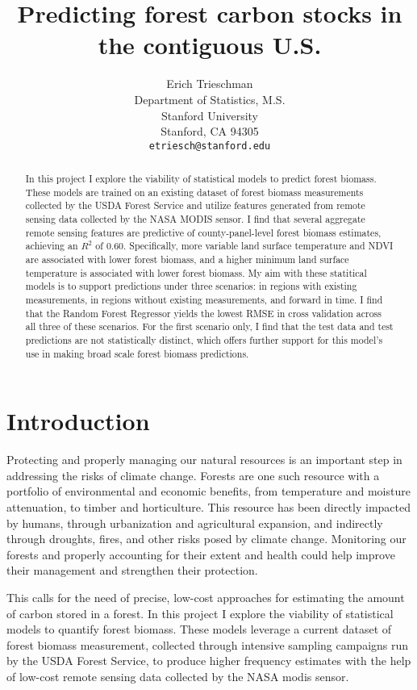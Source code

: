 \documentclass{article}
\title{Predicting forest carbon stocks in the contiguous U.S.}
\author{%
  Erich Trieschman\\
  Department of Statistics, M.S.\\
  Stanford University\\
  Stanford, CA 94305\\
  \texttt{etriesch@stanford.edu} \\
}
\begin{document}
\maketitle

\begin{abstract}
In this project I explore the viability of statistical models to predict forest biomass. These models are trained on an existing dataset of forest biomass measurements collected by the USDA Forest Service and utilize features generated from remote sensing data collected by the NASA MODIS sensor. I find that several aggregate remote sensing features are predictive of county-panel-level forest biomass estimates, achieving an $R^2$ of 0.60. Specifically, more variable land surface temperature and NDVI are associated with lower forest biomass, and a higher minimum land surface temperature is associated with lower forest biomass. My aim with these statitical models is to support predictions under three scenarios: in regions with existing measurements, in regions without existing measurements, and forward in time. I find that the Random Forest Regressor yields the lowest RMSE in cross validation across all three of these scenarios. For the first scenario only, I find that the test data and test predictions are not statistically distinct, which offers further support for this model's use in making broad scale forest biomass predictions.
\end{abstract}

\section{Introduction}
\label{sec:intro}
Protecting and properly managing our natural resources is an important step in addressing the risks of climate change. Forests are one such resource with a portfolio of environmental and economic benefits, from temperature and moisture attenuation, to timber and horticulture. This resource has been directly impacted by humans, through urbanization and agricultural expansion, and indirectly through droughts, fires, and other risks posed by climate change. Monitoring our forests and properly accounting for their extent and health could help improve their management and strengthen their protection.

This calls for the need of precise, low-cost approaches for estimating the amount of carbon stored in a forest. In this project I explore the viability of statistical models to quantify forest biomass. These models leverage a current dataset of forest biomass measurement, collected through intensive sampling campaigns run by the USDA Forest Service, to produce higher frequency estimates with the help of low-cost remote sensing data collected by the NASA modis sensor. 
\end{document}
